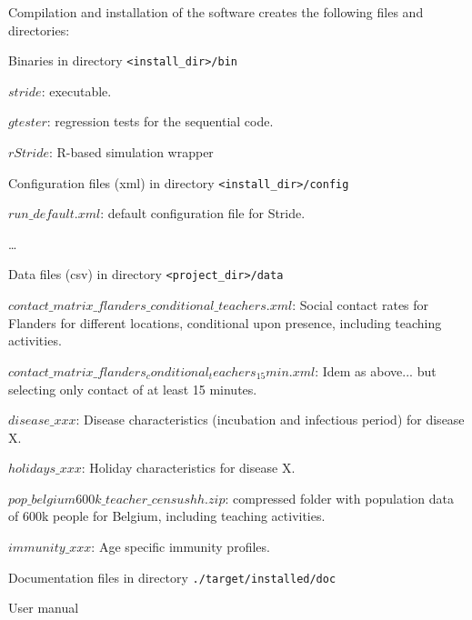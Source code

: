 Compilation and installation of the software creates the following files and directories:
\begin{compactitem}
%
	\item Binaries in directory \texttt{<install\_dir>/bin}
      		\begin{compactitem}
        			\item $stride$: executable.
        			\item $gtester$: regression tests for the sequential code.
        			\item $rStride$: R-based simulation wrapper
        	\end{compactitem}
%
    \item Configuration files (xml) in directory \texttt{<install\_dir>/config}
      	\begin{compactitem}
			\item $run\_default.xml$: default configuration file for Stride.
        		\item \ldots
        \end{compactitem}
%        
    \item Data files (csv) in directory \texttt{<project\_dir>/data}
      	\begin{compactitem}
 			\item $contact\_matrix\_flanders\_conditional\_teachers.xml$: Social contact rates for Flanders for different locations, conditional upon presence, including teaching activities.
			\item $contact\_matrix\_flanders_conditional_teachers_15min.xml$: Idem as above... but selecting only contact of at least 15 minutes. 
			\item $disease\_xxx$: Disease characteristics (incubation and infectious period) for disease X.
			\item $holidays\_xxx$: Holiday characteristics for disease X.
			\item $pop\_belgium600k\_teacher\_censushh.zip$: compressed folder with population data of 600k people for Belgium, including teaching activities.
			\item $immunity\_xxx$: Age specific immunity profiles.
        \end{compactitem}
%
    \item Documentation files in directory \texttt{./target/installed/doc}
      	\begin{compactitem}
            	\item User manual
        \end{compactitem}
%
\end{compactitem}

